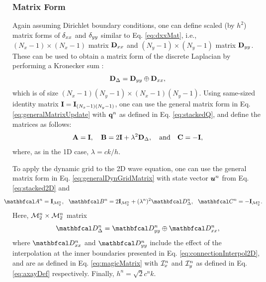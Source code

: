 \documentclass[fleqn]{jaes}
\begin{document}
\subsubsection{Matrix Form}
Again assuming Dirichlet boundary conditions, one can define scaled (by $h^2$) matrix forms of $\delta_{xx}$ and $\delta_{yy}$ similar to Eq. \eqref{eq:dxxMat}, i.e., $(N_x-1)\times(N_x-1)$ matrix $\mathbf{D}_{xx}$ and $(N_y-1)\times(N_y-1)$ matrix $\mathbf{D}_{yy}$. These can be used to obtain a matrix form of the discrete Laplacian by performing a Kronecker sum \cite{Horn1991, Hamilton2016}:
\begin{equation}\label{eq:kroneckerSum}
    \DDeltamat = \Dyy \oplus \Dxx,
\end{equation}
which is of size $(N_x-1)(N_y-1)\times (N_x-1)(N_y-1)$.
%
Using same-sized identity matrix $\mathbf{I} = \mathbf{I}_{(N_x-1)(N_y-1)}$, one can use the general matrix form in Eq. \eqref{eq:generalMatrixUpdate} with $\mathbf{q}^n$ as defined in Eq. \eqref{eq:stackedQ}, and define the matrices as follows:
\begin{equation}
    \A = \I, \quad \B = 2\I + \lambda^2 \DDeltamat, \qaq \C = -\I,
\end{equation}
where, as in the 1D case, $\lambda = c k /h$.

To apply the dynamic grid to the 2D wave equation, one can use the general matrix form in Eq. \eqref{eq:generalDynGridMatrix} with state vector $\boldsymbol{u}^n$ from Eq. \eqref{eq:stacked2D} and
\begin{equation}\label{eq:2DwaveDynMatrix}
    \!\!\!\!\!\!\!\!\!\AA = \I_\MtwoD, \ \ \BB = 2\I_\MtwoD + (\lambda^n)^2\DDDelta,\ \ \CC = -\I_\MtwoD.
\end{equation}
Here,
${\mathcal{M}_2^n} \times {\mathcal{M}_2^n}$ matrix
\begin{equation}\label{eq:dynamicKronecker}
    \DDDelta = \DDyy \oplus \DDxx,
\end{equation}
where $\DDxx$ and $\DDyy$ include the effect of the interpolation at the inner boundaries presented in Eq. \eqref{eq:connectionInterpol2D}, and are as defined in Eq. \eqref{eq:magicMatrix} with $\mathcal{I}^n_x$ and $\mathcal{I}^n_y$ as defined in Eq. \eqref{eq:axayDef} respectively. Finally, $h^n = \sqrt{2}c^n k$.
\end{document}
